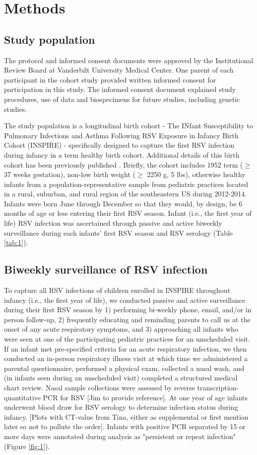 \documentclass{article}
\begin{document}
\section{Methods}
\subsection{Study population}
The protocol and informed consent documents were approved by the Institutional Review Board at Vanderbilt University Medical Center. 
One parent of each participant in the cohort study provided written informed consent for participation in this study. 
The informed consent document explained study procedures, use of data and biospecimens for future studies, including genetic studies.

The study population is a longitudinal birth cohort - The INfant Susceptibility to Pulmonary Infections and Asthma Following RSV Exposure in Infancy Birth Cohort (INSPIRE) - specifically designed to capture the first RSV infection during infancy in a term healthy birth cohort. 
Additional details of this birth cohort has been previously published 
\cite{larkin_objectives_2015}.
Briefly, the cohort includes 1952 term ($\ge$ 37 weeks gestation), non-low birth weight ($\ge$ 2250 g, 5 lbs), otherwise healthy infants from a population-representative sample from pediatric practices located in a rural, suburban, and rural region of the southeastern US during 2012-2014. 
Infants were born June through December so that they would, by design, be 6 months of age or less entering their first RSV season. 
Infant (i.e., the first year of life) RSV infection was ascertained through passive and active biweekly surveillance during each infants' first RSV season and RSV serology
(Table \ref{tab:1}).

\subsection{Biweekly surveillance of RSV infection}
To capture all RSV infections of children enrolled in INSPIRE throughout infancy (i.e., the first year of life), we conducted passive and active surveillance during their first RSV season by 1) performing bi-weekly phone, email, and/or in person follow-up, 2) frequently educating and reminding parents to call us at the onset of any acute respiratory symptoms, and 3) approaching all infants who were seen at one of the participating pediatric practices for an unscheduled visit. 
If an infant met pre-specified criteria for an acute respiratory infection, we then conducted an in-person respiratory illness visit at which time we administered a parental questionnaire, performed a physical exam, collected a nasal wash, and (in infants seen during an unscheduled visit) completed a structured medical chart review.
Nasal sample collections were assessed by reverse transcription-quantitative PCR for RSV [Jim to provide reference].
At one year of age infants underwent blood draw for RSV serology to determine infection status during infancy. 
[Plots with CT-value from Tina, either as supplemental or first mention later so not to pollute the order].
Infants with positive PCR separated by 15 or more days were annotated during analysis as "persistent or repeat infection"
(Figure \ref{fig:1}).
\end{document}
